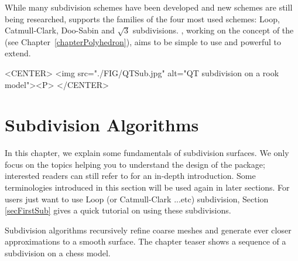 
While many subdivision schemes have been developed and new schemes 
are still being researched,  
supports the families of the four most used schemes: 
Loop, Catmull-Clark, Doo-Sabin and $\sqrt{3}$ subdivisions. 
, working on the concept of 
the  (see Chapter~\ref{chapterPolyhedron}), 
aims to be simple to use and powerful to extend.

\begin{ccHtmlOnly}
     <CENTER>
         <img src="./FIG/QTSub.jpg" alt="QT subdivision on a rook model"><P>
     </CENTER>
\end{ccHtmlOnly}

\section{Subdivision Algorithms}
\label{secSubAlgo}
In this chapter, we explain some fundamentals of 
subdivision surfaces. We only focus on the topics helping you 
to understand the design of the package; interested readers can
still refer to \cite{cgal:ww-smgd-02} for an in-depth introduction.
Some terminologies introduced in this section will be used again
in later sections. For users just want to use Loop (or 
Catmull-Clark ...etc) subdivision, Section \ref{secFirstSub} 
gives a quick tutorial on using these subdivisions.

Subdivision algorithms recursively refine coarse meshes and generate 
ever closer approximations to a smooth surface.
The chapter teaser shows a sequence of a subdivision on 
a chess model. 

